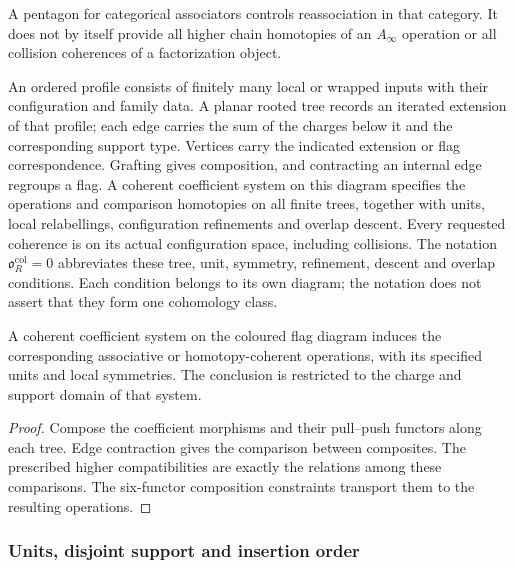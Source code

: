A pentagon for categorical associators controls reassociation in
that category. It does not by itself provide all higher chain
homotopies of an $A_\infty$ operation or all collision coherences
of a factorization object.

\begin{definition}
\label{def:higher-coloured-hybrid-tree-category}
An ordered profile consists of finitely many local or wrapped
inputs with their configuration and family data. A planar rooted
tree records an iterated extension of that profile; each edge
carries the sum of the charges below it and the corresponding
support type. Vertices carry the indicated extension or flag
correspondence. Grafting gives composition, and contracting an
internal edge regroups a flag.
A coherent coefficient system on this diagram specifies the
operations and comparison homotopies on all finite trees, together
with units, local relabellings, configuration refinements and
overlap descent. Every requested coherence is on its actual
configuration space, including collisions.
The notation $\mathfrak o^{\mathrm{col}}_R=0$ abbreviates
these tree, unit, symmetry, refinement, descent and overlap
conditions. Each condition belongs to its own diagram; the
notation does not assert that they form one cohomology class.
\end{definition}

\begin{proposition}
\label{prop:higher-coloured-residual-vanishing-criterion}
A coherent coefficient system on the coloured flag diagram
induces the corresponding associative or homotopy-coherent
operations, with its specified units and local symmetries.
The conclusion is restricted to the charge and support domain of
that system.
\end{proposition}

\begin{proof}
Compose the coefficient morphisms and their pull--push functors
along each tree. Edge contraction gives the comparison between
composites. The prescribed higher compatibilities are exactly the
relations among these comparisons. The six-functor composition
constraints transport them to the resulting operations.
\end{proof}

\subsubsection*{Units, disjoint support and insertion order}

